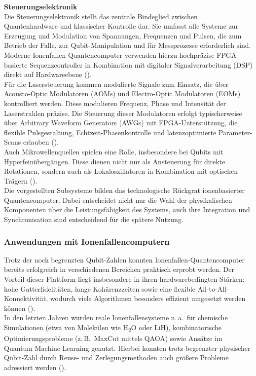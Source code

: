 \textbf{Steuerungselektronik} \\
Die Steuerungselektronik stellt das zentrale Bindeglied zwischen Quantenhardware und klassischer Kontrolle dar. Sie umfasst alle Systeme zur Erzeugung und Modulation von Spannungen, Frequenzen und Pulsen, die zum Betrieb der Falle, zur Qubit-Manipulation und für Messprozesse erforderlich sind. Moderne Ionenfallen-Quantencomputer verwenden hierzu hochpräzise FPGA-basierte Sequenzcontroller in Kombination mit digitaler Signalverarbeitung (DSP) direkt auf Hardwareebene (\cite{keysightElectronicsTrappedIon2025}). \\
Für die Lasersteuerung kommen modulierte Signale zum Einsatz, die über Acousto-Optic Modulatoren (AOMs) und Electro-Optic Modulatoren (EOMs) kontrolliert werden. Diese modulieren Frequenz, Phase und Intensität der Laserstrahlen präzise. Die Steuerung dieser Modulatoren erfolgt typischerweise über Arbitrary Waveform Generators (AWGs) mit FPGA-Unterstützung, die flexible Pulsgestaltung, Echtzeit-Phasenkontrolle und latenzoptimierte Parameter-Scans erlauben (\cite{keysightElectronicsTrappedIon2025}). \\
Auch Mikrowellenquellen spielen eine Rolle, insbesondere bei Qubits mit Hyperfeinübergängen. Diese dienen nicht nur als Ansteuerung für direkte Rotationen, sondern auch als Lokaloszillatoren in Kombination mit optischen Trägern (\cite{keysightElectronicsTrappedIon2025}). \\

Die vorgestellten Subsysteme bilden das technologische Rückgrat ionenbasierter Quantencomputer. Dabei entscheidet nicht nur die Wahl der physikalischen Komponenten über die Leistungsfähigkeit des Systems, auch ihre Integration und Synchronisation sind entscheidend für die spätere Nutzung.

\subsubsection{Anwendungen mit Ionenfallencomputern}
Trotz der noch begrenzten Qubit-Zahlen konnten Ionenfallen-Quantencomputer bereits erfolgreich in verschiedenen Bereichen praktisch erprobt werden. Der Vorteil dieser Plattform liegt insbesondere in ihren hardwarebedingten Stärken: hohe Gatterfidelitäten, lange Kohärenzzeiten sowie eine flexible All-to-All-Konnektivität, wodurch viele Algorithmen besonders effizient umgesetzt werden können (\cite{strohmIonBasedQuantumComputing2024}). \\

In den letzten Jahren wurden reale Ionenfallensysteme u.\,a.\ für chemische Simulationen (etwa von Molekülen wie H\textsubscript{2}O oder LiH), kombinatorische Optimierungsprobleme (z.\,B.\ MaxCut mittels QAOA) sowie Ansätze im Quantum Machine Learning genutzt. Hierbei konnten trotz begrenzter physischer Qubit-Zahl durch Reuse- und Zerlegungsmethoden auch größere Probleme adressiert werden (\cite{strohmIonBasedQuantumComputing2024}). \\


